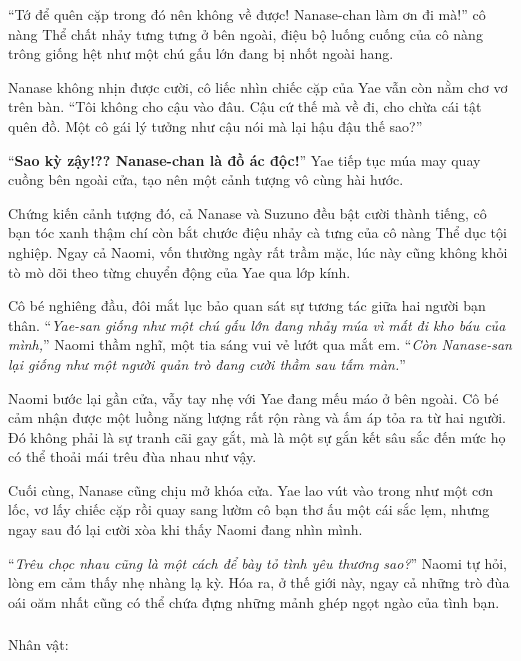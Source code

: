 \documentclass[../main.tex]{subfiles}
\begin{document}
``Tớ để quên cặp trong đó nên không về được! Nanase-chan làm ơn đi mà!'' cô nàng Thể chất nhảy tưng tưng ở bên ngoài, điệu bộ luống cuống của cô nàng trông giống hệt như một chú gấu lớn đang bị nhốt ngoài hang.

Nanase không nhịn được cười, cô liếc nhìn chiếc cặp của Yae vẫn còn nằm chơ vơ trên bàn. ``Tôi không cho cậu vào đâu. Cậu cứ thế mà về đi, cho chừa cái tật quên đồ. Một cô gái lý tưởng như cậu nói mà lại hậu đậu thế sao?''

``\textbf{Sao kỳ zậy!?? Nanase-chan là đồ ác độc!}'' Yae tiếp tục múa may quay cuồng bên ngoài cửa, tạo nên một cảnh tượng vô cùng hài hước.

Chứng kiến cảnh tượng đó, cả Nanase và Suzuno đều bật cười thành tiếng, cô bạn tóc xanh thậm chí còn bắt chước điệu nhảy cà tưng của cô nàng Thể dục tội nghiệp. Ngay cả Naomi, vốn thường ngày rất trầm mặc, lúc này cũng không khỏi tò mò dõi theo từng chuyển động của Yae qua lớp kính.

Cô bé nghiêng đầu, đôi mắt lục bảo quan sát sự tương tác giữa hai người bạn thân. ``\textit{Yae-san giống như một chú gấu lớn đang nhảy múa vì mất đi kho báu của mình,}'' Naomi thầm nghĩ, một tia sáng vui vẻ lướt qua mắt em. ``\textit{Còn Nanase-san lại giống như một người quản trò đang cười thầm sau tấm màn.}''

Naomi bước lại gần cửa, vẫy tay nhẹ với Yae đang mếu máo ở bên ngoài. Cô bé cảm nhận được một luồng năng lượng rất rộn ràng và ấm áp tỏa ra từ hai người. Đó không phải là sự tranh cãi gay gắt, mà là một sự gắn kết sâu sắc đến mức họ có thể thoải mái trêu đùa nhau như vậy.

Cuối cùng, Nanase cũng chịu mở khóa cửa. Yae lao vút vào trong như một cơn lốc, vơ lấy chiếc cặp rồi quay sang lườm cô bạn thơ ấu một cái sắc lẹm, nhưng ngay sau đó lại cười xòa khi thấy Naomi đang nhìn mình.

``\textit{Trêu chọc nhau cũng là một cách để bày tỏ tình yêu thương sao?}'' Naomi tự hỏi, lòng em cảm thấy nhẹ nhàng lạ kỳ. Hóa ra, ở thế giới này, ngay cả những trò đùa oái oăm nhất cũng có thể chứa đựng những mảnh ghép ngọt ngào của tình bạn.

\newpage

\subsubsection*{\label{ep-ER14}}
\begin{center}{\caviar Nhân vật:    }\end{center}
\end{document}
